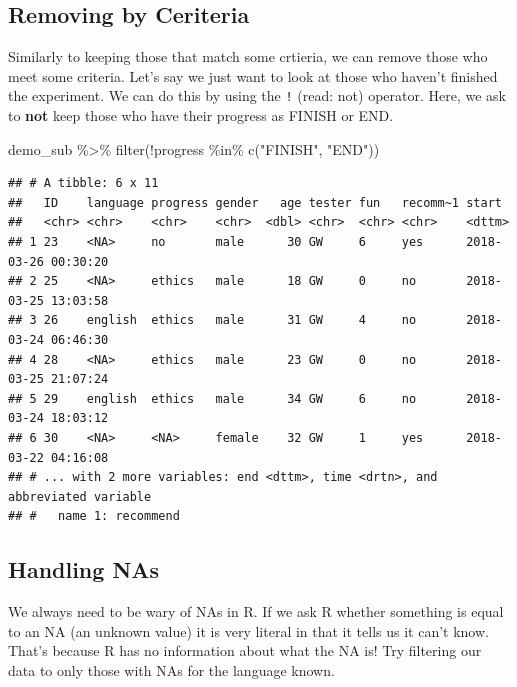\documentclass[
]{book}
\newenvironment{Shaded}{\begin{snugshade}}{\end{snugshade}}
\newcommand{\FunctionTok}[1]{\textcolor[rgb]{0.00,0.00,0.00}{#1}}
\newcommand{\NormalTok}[1]{#1}
\newcommand{\SpecialCharTok}[1]{\textcolor[rgb]{0.00,0.00,0.00}{#1}}
\newcommand{\StringTok}[1]{\textcolor[rgb]{0.31,0.60,0.02}{#1}}
\begin{document}
\hypertarget{removing-by-ceriteria}{%
\subsection{Removing by Ceriteria}\label{removing-by-ceriteria}}

Similarly to keeping those that match some crtieria, we can remove those who meet some criteria. Let's say we just want to look at those who haven't finished the experiment. We can do this by using the \texttt{!} (read: not) operator. Here, we ask to \textbf{not} keep those who have their progress as FINISH or END.

\begin{Shaded}
\begin{Highlighting}[]
\NormalTok{demo\_sub }\SpecialCharTok{\%\textgreater{}\%} \FunctionTok{filter}\NormalTok{(}\SpecialCharTok{!}\NormalTok{progress }\SpecialCharTok{\%in\%} \FunctionTok{c}\NormalTok{(}\StringTok{"FINISH"}\NormalTok{, }\StringTok{"END"}\NormalTok{))}
\end{Highlighting}
\end{Shaded}

\begin{verbatim}
## # A tibble: 6 x 11
##   ID    language progress gender   age tester fun   recomm~1 start              
##   <chr> <chr>    <chr>    <chr>  <dbl> <chr>  <chr> <chr>    <dttm>             
## 1 23    <NA>     no       male      30 GW     6     yes      2018-03-26 00:30:20
## 2 25    <NA>     ethics   male      18 GW     0     no       2018-03-25 13:03:58
## 3 26    english  ethics   male      31 GW     4     no       2018-03-24 06:46:30
## 4 28    <NA>     ethics   male      23 GW     0     no       2018-03-25 21:07:24
## 5 29    english  ethics   male      34 GW     6     no       2018-03-24 18:03:12
## 6 30    <NA>     <NA>     female    32 GW     1     yes      2018-03-22 04:16:08
## # ... with 2 more variables: end <dttm>, time <drtn>, and abbreviated variable
## #   name 1: recommend
\end{verbatim}

\hypertarget{handling-nas}{%
\subsection{Handling NAs}\label{handling-nas}}

We always need to be wary of NAs in R. If we ask R whether something is equal to an NA (an unknown value) it is very literal in that it tells us it can't know. That's because R has no information about what the NA is! Try filtering our data to only those with NAs for the language known.
\end{document}
